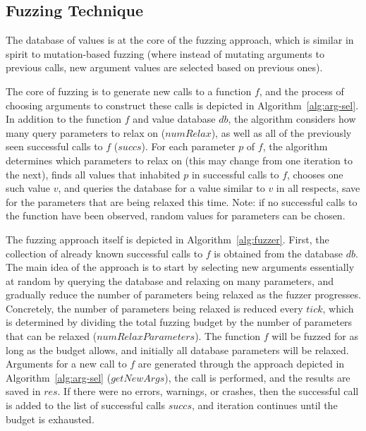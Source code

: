 \documentclass[sigplan,anonymous,review]{acmart}
\begin{document}

\subsection{Fuzzing Technique}

The database of values is at the core of the fuzzing approach, which is similar in spirit to mutation-based fuzzing (where instead of mutating arguments to previous calls, new argument values are selected based on previous ones).

The core of fuzzing is to generate new calls to a function $f$, and the process of choosing arguments to construct these calls is depicted in Algorithm~\ref{alg:arg-sel}.
In addition to the function $f$ and value database $db$, the algorithm considers how many query parameters to relax on ($numRelax$), as well as all of the previously seen successful calls to $f$ ($succs$).
For each parameter $p$ of $f$, the algorithm determines which parameters to relax on (this may change from one iteration to the next), finds all values that inhabited $p$ in successful calls to $f$, chooses one such value $v$, and queries the database for a value similar to $v$ in all respects, save for the parameters that are being relaxed this time.
Note: if no successful calls to the function have been observed, random values for parameters can be chosen.

The fuzzing approach itself is depicted in Algorithm~\ref{alg:fuzzer}.
First, the collection of already known successful calls to $f$ is obtained from the database $db$.
The main idea of the approach is to start by selecting new arguments essentially at random by querying the database and relaxing on many parameters, and gradually reduce the number of parameters being relaxed as the fuzzer progresses.
Concretely, the number of parameters being relaxed is reduced every $tick$, which is determined by dividing the total fuzzing budget by the number of parameters that can be relaxed ($numRelaxParameters$).
The function $f$ will be fuzzed for as long as the budget allows, and initially all database parameters will be relaxed.
Arguments for a new call to $f$ are generated through the approach depicted in Algorithm~\ref{alg:arg-sel} ($getNewArgs$), the call is performed, and the results are saved in $res$.
If there were no errors, warnings, or crashes, then the successful call is added to the list of successful calls $succs$, and iteration continues until the budget is exhausted.
\end{document}
